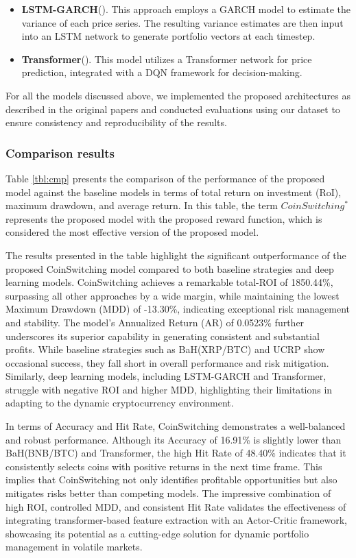 \begin{itemize}
	\item \textbf{LSTM-GARCH}(\citet{garcia2024lstm}). This approach employs a GARCH model to estimate the variance of each price series. The resulting variance estimates are then input into an LSTM network to generate portfolio vectors at each timestep.
	
	\item \textbf{Transformer}(\citet{kumar2024transformer}). This model utilizes a Transformer network for price prediction, integrated with a DQN framework for decision-making.
	
\end{itemize}

For all the models discussed above, we implemented the proposed architectures as described in the original papers and conducted evaluations using our dataset to ensure consistency and reproducibility of the results.


\subsubsection{Comparison results}

Table \ref{tbl:cmp} presents the comparison of the performance of the proposed model against the baseline models in terms of total return on investment (RoI), maximum drawdown, and average return. In this table, the term $CoinSwitching^*$ represents the proposed model with the proposed reward function, which is considered the most effective version of the proposed model.

The results presented in the table highlight the significant outperformance of the proposed CoinSwitching model compared to both baseline strategies and deep learning models. CoinSwitching achieves a remarkable total-ROI of 1850.44\%, surpassing all other approaches by a wide margin, while maintaining the lowest Maximum Drawdown (MDD) of -13.30\%, indicating exceptional risk management and stability. The model's Annualized Return (AR) of 0.0523\% further underscores its superior capability in generating consistent and substantial profits. While baseline strategies such as BaH(XRP/BTC) and UCRP show occasional success, they fall short in overall performance and risk mitigation. Similarly, deep learning models, including LSTM-GARCH and Transformer, struggle with negative ROI and higher MDD, highlighting their limitations in adapting to the dynamic cryptocurrency environment.

In terms of Accuracy and Hit Rate, CoinSwitching demonstrates a well-balanced and robust performance. Although its Accuracy of 16.91\% is slightly lower than BaH(BNB/BTC) and Transformer, the high Hit Rate of 48.40\% indicates that it consistently selects coins with positive returns in the next time frame. This implies that CoinSwitching not only identifies profitable opportunities but also mitigates risks better than competing models. The impressive combination of high ROI, controlled MDD, and consistent Hit Rate validates the effectiveness of integrating transformer-based feature extraction with an Actor-Critic framework, showcasing its potential as a cutting-edge solution for dynamic portfolio management in volatile markets.

